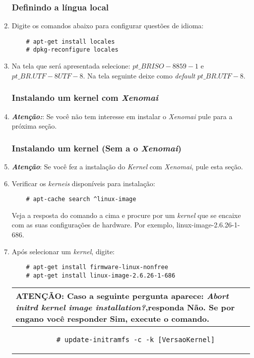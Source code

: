 \documentclass[a4paper,10pt]{article}
\begin{document}
\begin{enumerate}
    \subsubsection{Definindo a língua local}
    \item Digite os comandos abaixo para configurar questões de idioma:
      \begin{lstlisting}
	# apt-get install locales
	# dpkg-reconfigure locales
      \end{lstlisting}
    \item Na tela que será apresentada selecione: $pt\_BR ISO-8859-1$ e $pt\_BR.UTF-8 UTF-8$. Na tela 
	seguinte deixe como \emph{default} $pt\_BR.UTF-8$. 

    \subsubsection{Instalando um kernel com \emph{Xenomai}}
    \item \textbf{\emph{Atenção:}}: Se você não tem interesse em instalar o \emph{Xenomai} pule para a próxima seção. 
      

    \subsubsection{Instalando um kernel (Sem a o \emph{Xenomai})}
    \item \textbf{\emph{Atenção}}: Se você fez a instalação do \emph{Kernel} com \emph{Xenomai}, pule esta seção.
    \item Verificar os \emph{kerneis} disponíveis para instalação:
      \begin{lstlisting}
	# apt-cache search ^linux-image
      \end{lstlisting}
      Veja a resposta do comando a cima e procure por um \emph{kernel} que se encaixe com as 
      suas configurações de hardware. Por exemplo, linux-image-2.6.26-1-686.
    \item Após selecionar um \emph{kernel}, digite:
      \begin{lstlisting}
	# apt-get install firmware-linux-nonfree
	# apt-get install linux-image-2.6.26-1-686
      \end{lstlisting}

	 \begin{center}
	    \begin{tabular}{|p{8cm}|}
	      \hline
		\textbf{ATENÇÃO}: Caso a seguinte pergunta aparece: \emph{Abort initrd kernel 
		    image installation?},responda Não. Se por engano você responder Sim, 
		    execute o comando.\\
	      \hline
		\begin{verbatim}
		  # update-initramfs -c -k [VersaoKernel]
		\end{verbatim}\\
	      \hline
	    \end{tabular}
	  \end{center}


\end{enumerate}
\end{document}
